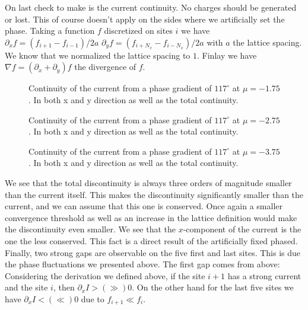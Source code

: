\documentclass[..\main.tex]{subfile}
\begin{document}
On last check to make is the current continuity. No charges should be generated or lost. This of course doesn't apply on
the sides where we artificially set the phase. Taking a function $f$ discretized on sites $i$ we have $\partial_x f = (f_{i+1} - f_{i-1} )/2a$
$\partial_y f = (f_{i+N_x} - f_{i-N_x} )/2a$ with
$a$ the lattice spacing. We know that we normalized the lattice spacing to $1$. Finlay we have $\nabla f = (\partial_x + \partial_y) f$ the divergence
of $f$.
\begin{figure}[H]
    
    \caption{Continuity of the current from a phase gradient of $117^{\circ}$ at $\mu = -1.75$. In both x and y direction as
    well as the total continuity.}
\end{figure}
\begin{figure}[H]
    
    \caption{Continuity of the current from a phase gradient of $117^{\circ}$ at $\mu = -2.75$. In both x and y direction as
    well as the total continuity.}
\end{figure}
\begin{figure}[H]
    
    \caption{Continuity of the current from a phase gradient of $117^{\circ}$ at $\mu = -3.75$. In both x and y direction as
    well as the total continuity.}
\end{figure}
We see that the total discontinuity is always three orders of magnitude smaller than the current itself. This makes the discontinuity
significantly smaller than the current, and we can assume that this one is conserved. Once again a smaller convergence threshold
as well as an increase in the lattice definition would make the discontinuity even smaller.
We see that the $x$-component of the current is the one the less conserved. This fact is a direct result of the artificially fixed phased.\\
Finally, two strong gaps are observable on the five first and last sites. This is due the phase fluctuations we presented above. The first gap
comes from above: Considering the derivation we defined above, if the site $i+1$ has a strong current and the site $i$, then $\partial_x I >(\gg)0$.
On the other hand for the last five sites we have $\partial_x I <(\ll)0$ due to $f_{i+1}\ll f_i$.
\end{document}
